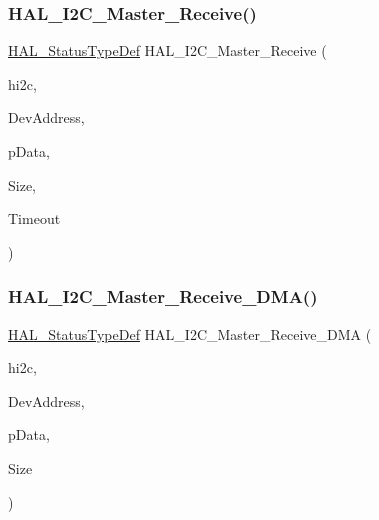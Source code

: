 \subsubsection{\texorpdfstring{H\+A\+L\+\_\+\+I2\+C\+\_\+\+Master\+\_\+\+Receive()}{HAL\_I2C\_Master\_Receive()}}
{\footnotesize\ttfamily \hyperlink{stm32f4xx__hal__def_8h_a63c0679d1cb8b8c684fbb0632743478f}{H\+A\+L\+\_\+\+Status\+Type\+Def} H\+A\+L\+\_\+\+I2\+C\+\_\+\+Master\+\_\+\+Receive (\begin{DoxyParamCaption}\item[{\hyperlink{group___i2_c__handle___structure__definition_ga68e9f45c2fd2161fb827ccdeabb55ea5}{I2\+C\+\_\+\+Handle\+Type\+Def} $\ast$}]{hi2c,  }\item[{uint16\+\_\+t}]{Dev\+Address,  }\item[{uint8\+\_\+t $\ast$}]{p\+Data,  }\item[{uint16\+\_\+t}]{Size,  }\item[{uint32\+\_\+t}]{Timeout }\end{DoxyParamCaption})}

\mbox{\label{group___i2_c___exported___functions___group2_ga299f5e16a92826b9856c60265bc22cf2}} 
\subsubsection{\texorpdfstring{H\+A\+L\+\_\+\+I2\+C\+\_\+\+Master\+\_\+\+Receive\+\_\+\+D\+M\+A()}{HAL\_I2C\_Master\_Receive\_DMA()}}
{\footnotesize\ttfamily \hyperlink{stm32f4xx__hal__def_8h_a63c0679d1cb8b8c684fbb0632743478f}{H\+A\+L\+\_\+\+Status\+Type\+Def} H\+A\+L\+\_\+\+I2\+C\+\_\+\+Master\+\_\+\+Receive\+\_\+\+D\+MA (\begin{DoxyParamCaption}\item[{\hyperlink{group___i2_c__handle___structure__definition_ga68e9f45c2fd2161fb827ccdeabb55ea5}{I2\+C\+\_\+\+Handle\+Type\+Def} $\ast$}]{hi2c,  }\item[{uint16\+\_\+t}]{Dev\+Address,  }\item[{uint8\+\_\+t $\ast$}]{p\+Data,  }\item[{uint16\+\_\+t}]{Size }\end{DoxyParamCaption})}

